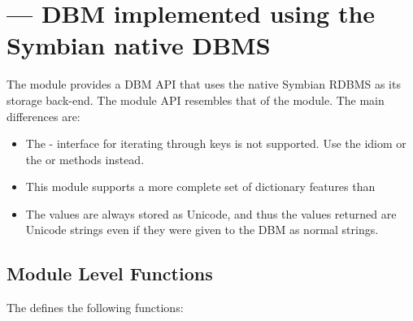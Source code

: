 %
%
%

\section{ ---
  DBM implemented using the Symbian native DBMS}
\label{sec:e32dbm}


The  module provides a DBM API that uses the native
Symbian RDBMS as its storage back-end. The module API resembles that
of the  module. The main differences are:

\begin{itemize}
\item The  -  interface for iterating through keys is not supported. Use the  idiom or the  or  methods instead.
\item This module supports a more complete set of dictionary features than 
\item The values are always stored as Unicode, and thus the values returned are Unicode strings even if they were given to the DBM as normal strings.
\end{itemize}
\subsection{Module Level Functions}
\label{subsec:mylabel16}

The  defines the following functions:

